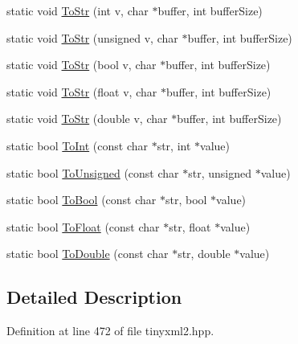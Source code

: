 \begin{DoxyCompactItemize}
\item 
static void \hyperlink{classtinyxml2_1_1_x_m_l_util_a3cd6c703d49b9d51bdf0f4ff6aa021c7}{To\-Str} (int v, char $\ast$buffer, int buffer\-Size)
\item 
static void \hyperlink{classtinyxml2_1_1_x_m_l_util_ac00c2e52c1c36dab3ff41d86a9bf60f9}{To\-Str} (unsigned v, char $\ast$buffer, int buffer\-Size)
\item 
static void \hyperlink{classtinyxml2_1_1_x_m_l_util_adba0718527ae9e80f663a71ea325cb11}{To\-Str} (bool v, char $\ast$buffer, int buffer\-Size)
\item 
static void \hyperlink{classtinyxml2_1_1_x_m_l_util_a8957ad44fee5fa02ba52d73aad4d0a31}{To\-Str} (float v, char $\ast$buffer, int buffer\-Size)
\item 
static void \hyperlink{classtinyxml2_1_1_x_m_l_util_a1cd141e50980fcddd6bf9af5de4b1db7}{To\-Str} (double v, char $\ast$buffer, int buffer\-Size)
\item 
static bool \hyperlink{classtinyxml2_1_1_x_m_l_util_ad4df4023d11ee3fca9689c49b9707323}{To\-Int} (const char $\ast$str, int $\ast$value)
\item 
static bool \hyperlink{classtinyxml2_1_1_x_m_l_util_a210c8637d5eb4ce3d4625294af0efc2f}{To\-Unsigned} (const char $\ast$str, unsigned $\ast$value)
\item 
static bool \hyperlink{classtinyxml2_1_1_x_m_l_util_ae5b03e0a1ca5d42052a7ac540f7aa12a}{To\-Bool} (const char $\ast$str, bool $\ast$value)
\item 
static bool \hyperlink{classtinyxml2_1_1_x_m_l_util_a399e71edb5f29d61ea81d91ee0332bb9}{To\-Float} (const char $\ast$str, float $\ast$value)
\item 
static bool \hyperlink{classtinyxml2_1_1_x_m_l_util_ad8f75ac140fb19c1c6e164a957c4cd53}{To\-Double} (const char $\ast$str, double $\ast$value)
\end{DoxyCompactItemize}


\subsection{Detailed Description}


Definition at line 472 of file tinyxml2.\-hpp.



